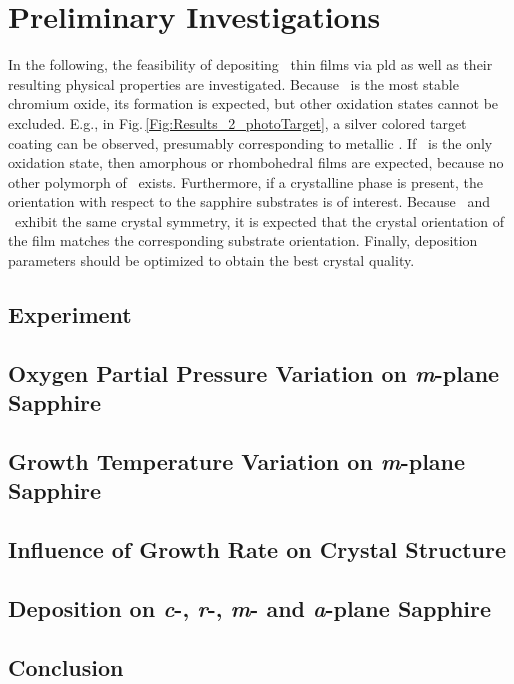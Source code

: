 \section{Preliminary Investigations}
    \label{Sec:Results_Preliminary}
In the following, the feasibility of depositing \cro\ thin films via \gls{pld} as well as their resulting physical properties are investigated.
Because \cro\ is the most stable chromium oxide, its formation is expected, but other oxidation states cannot be excluded.
E.g., in Fig.\,\ref{Fig:Results_2_photoTarget}, a silver colored target coating can be observed, presumably corresponding to metallic .
If \cro\ is the only oxidation state, then amorphous or rhombohedral films are expected, because no other polymorph of \cro\ exists.
Furthermore, if a crystalline phase is present, the orientation with respect to the sapphire substrates is of interest.
Because \alo\ and \cro\ exhibit the same crystal symmetry, it is expected that the crystal orientation of the film  matches the corresponding substrate orientation.
Finally, deposition parameters should be optimized to obtain the best crystal quality.

\subsection{Experiment}
    

    \subsection{Oxygen Partial Pressure Variation on \textit{m}-plane Sapphire}
        
    \subsection{Growth Temperature Variation on \textit{m}-plane Sapphire}
        
    \subsection{Influence of Growth Rate on Crystal Structure}
        
    \subsection{Deposition on \textit{c}-, \textit{r}-, \textit{m}- and \textit{a}-plane Sapphire}
        

\subsection{Conclusion}
    